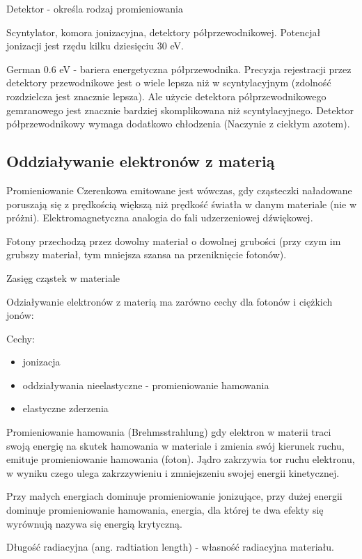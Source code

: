 \documentclass{article}
\begin{document}
Detektor - określa rodzaj promieniowania

Scyntylator, komora jonizacyjna, detektory półprzewodnikowej. Potencjał jonizacji jest rzędu kilku dziesięciu 30 eV.

German 0.6 eV - bariera energetyczna półprzewodnika. Precyzja rejestracji przez detektory przewodnikowe jest o wiele lepsza niż w scyntylacyjnym (zdolność rozdzielcza jest znacznie lepsza). Ale użycie detektora półprzewodnikowego gemranowego jest znacznie bardziej skomplikowana niż scyntylacyjnego. Detektor półprzewodnikowy wymaga dodatkowo chłodzenia (Naczynie z ciekłym azotem).

\subsection{Oddziaływanie elektronów z materią}

Promieniowanie Czerenkowa emitowane jest wówczas, gdy cząsteczki naładowane poruszają się z prędkością większą niż prędkość światła w danym materiale (nie w próżni). Elektromagnetyczna analogia do fali udzerzeniowej dźwiękowej.

Fotony przechodzą przez dowolny materiał o dowolnej grubości (przy czym im grubszy materiał, tym mniejsza szansa na przeniknięcie fotonów).

Zasięg cząstek w materiale

Odziaływanie elektronów z materią ma zarówno cechy dla fotonów i ciężkich jonów:

Cechy:
\begin{itemize}
    \item jonizacja
    \item oddziaływania nieelastyczne - promieniowanie hamowania
    \item elastyczne zderzenia
\end{itemize}

Promieniowanie hamowania (Brehmsstrahlung) gdy elektron w materii traci swoją energię na skutek hamowania w materiale i zmienia swój kierunek ruchu, emituje promieniowanie hamowania (foton). Jądro zakrzywia tor ruchu elektronu, w wyniku czego ulega zakrzzywieniu i zmniejszeniu swojej energii kinetycznej.

Przy małych energiach dominuje promieniowanie jonizujące, przy dużej energii dominuje promieniowanie hamowania, energia, dla której te dwa efekty się wyrównują nazywa się energią krytyczną.

Długość radiacyjna (ang. radtiation length) - własność radiacyjna materiału.
\end{document}
